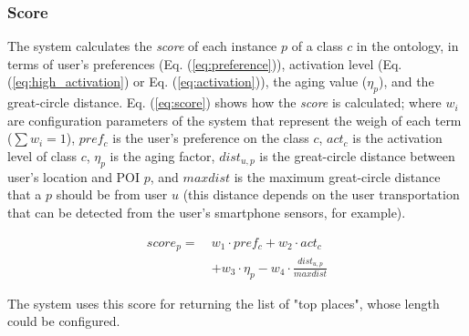 \subsubsection{\bf Score} \label{section:score}
The system calculates the \textit{score} of each instance $p$ of a class $c$ in  the ontology, in terms of user's preferences (Eq. (\ref{eq:preference})), activation level (Eq. (\ref{eq:high_activation}) or Eq. (\ref{eq:activation})), the aging value ($\eta_p$), and the great-circle distance. Eq. (\ref{eq:score}) shows how the \textit{score} is calculated; where $w_i$ are configuration parameters of the system that represent the weigh of each term ($\sum w_i =1$), $pref_c$ is the user's preference on the class $c$, $act_c$ is the activation level of class $c$, $\eta_p$ is the aging factor, $dist_{u,p}$ is the great-circle distance between user's location and POI $p$, and $maxdist$ is the maximum great-circle distance that a $p$ should be from user $u$  (this distance depends on the user transportation that can be detected  from the user's smartphone sensors, for example).


\begin{equation} \label{eq:score}
    \begin{split}
score_p =   \ &w_1 \cdot pref_c + w_2 \cdot act_c \\
                                        &+ w_3 \cdot \eta_p - w_4 \cdot \frac{dist_{u,p}}{maxdist}
    \end{split}
\end{equation}

The system uses this score for returning the list of "top places", whose length could be configured.




